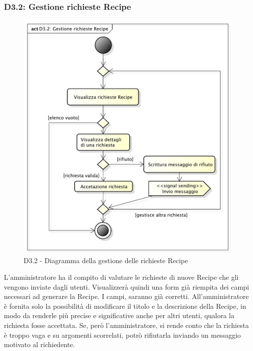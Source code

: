 		\subsubsection{D3.2: Gestione richieste Recipe} %
		\label{ssub:gestione_richieste_recipe}
		\begin{figure}[!htbp]
			\centering
			\centerline{\includegraphics[scale=0.45]{./images/D3_2.pdf}}
			\caption{D3.2 - Diagramma della gestione delle richieste Recipe}
		\end{figure}
		\noindent
		L'amministratore ha il compito di valutare le richieste di nuove Recipe che gli vengono inviate dagli utenti. Visualizzerà quindi una form già riempita dei campi necessari ad generare la Recipe. I campi, saranno già corretti. All'amministratore è fornita solo la possibilità di modificare il titolo e la descrizione della Recipe, in modo da renderle più precise e significative anche per altri utenti, qualora la richiesta fosse accettata. \newline
		Se, però l'amministratore, si rende conto che la richiesta è troppo vaga e su argomenti scorrelati, potrò rifiutarla inviando un messaggio motivato al richiedente.

